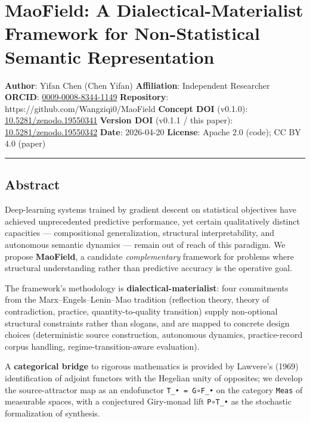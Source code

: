 \documentclass[
]{article}
\author{}
\date{}
\begin{document}
\hypertarget{maofield-a-dialectical-materialist-framework-for-non-statistical-semantic-representation}{%
\section{MaoField: A Dialectical-Materialist Framework for
Non-Statistical Semantic
Representation}\label{maofield-a-dialectical-materialist-framework-for-non-statistical-semantic-representation}}

\textbf{Author}: Yifan Chen (Chen Yifan) \textbf{Affiliation}:
Independent Researcher \textbf{ORCID}:
\href{https://orcid.org/0009-0008-8344-1149}{0009-0008-8344-1149}
\textbf{Repository}: https://github.com/Wangziqi0/MaoField
\textbf{Concept DOI} (v0.1.0):
\href{https://doi.org/10.5281/zenodo.19550341}{10.5281/zenodo.19550341}
\textbf{Version DOI} (v0.1.1 / this paper):
\href{https://doi.org/10.5281/zenodo.19550342}{10.5281/zenodo.19550342}
\textbf{Date}: 2026-04-20 \textbf{License}: Apache 2.0 (code); CC BY 4.0
(paper)

\begin{center}\rule{0.5\linewidth}{0.5pt}\end{center}

\hypertarget{abstract}{%
\subsection{Abstract}\label{abstract}}

Deep-learning systems trained by gradient descent on statistical
objectives have achieved unprecedented predictive performance, yet
certain qualitatively distinct capacities --- compositional
generalization, structural interpretability, and autonomous semantic
dynamics --- remain out of reach of this paradigm. We propose
\textbf{MaoField}, a candidate \emph{complementary} framework for
problems where structural understanding rather than predictive accuracy
is the operative goal.

The framework's methodology is \textbf{dialectical-materialist}: four
commitments from the Marx--Engels--Lenin--Mao tradition (reflection
theory, theory of contradiction, practice, quantity-to-quality
transition) supply non-optional structural constraints rather than
slogans, and are mapped to concrete design choices (deterministic source
construction, autonomous dynamics, practice-record corpus handling,
regime-transition-aware evaluation).

A \textbf{categorical bridge} to rigorous mathematics is provided by
Lawvere's (1969) identification of adjoint functors with the Hegelian
unity of opposites; we develop the source-attractor map as an
endofunctor \texttt{T\_•\ =\ G∘F\_•} on the category \texttt{Meas} of
measurable spaces, with a conjectured Giry-monad lift \texttt{P∘T\_•} as
the stochastic formalization of synthesis.
\end{document}
